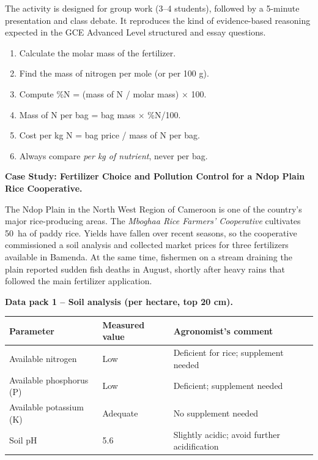 \documentclass[11pt]{article}
\newcommand{\cle}[1]{{\popxbold\color{popdark}#1}}
\newcounter{popsec}
\newcounter{popsub}
\newcommand{\courssub}[1]{%
  \stepcounter{popsub}%
  \par\vspace{9pt}\noindent{\popxbold\fontsize{11.5}{13}\selectfont\color{popink}{\color{poporange}\thepopsec.\thepopsub}\hspace{6pt}#1}\par\nopagebreak\vspace{4pt}
}
\begin{document}
The activity is designed for group work (3--4 students), followed by a 5-minute presentation and class debate. It reproduces the kind of evidence-based reasoning expected in the GCE Advanced Level structured and essay questions.

\begin{methode}
\begin{enumerate}
\item Calculate the molar mass of the fertilizer.
\item Find the mass of nitrogen per mole (or per 100 g).
\item Compute \%N = (mass of N / molar mass) $\times$ 100.
\item Mass of N per bag = bag mass $\times$ \%N/100.
\item Cost per kg N = bag price / mass of N per bag.
\item Always compare \emph{per kg of nutrient}, never per bag.
\end{enumerate}
\end{methode}

\courssub{Situation}

\textbf{Case Study: Fertilizer Choice and Pollution Control for a Ndop Plain Rice Cooperative.}

The Ndop Plain in the North West Region of Cameroon is one of the country's major rice-producing areas. The \emph{Mboghaa Rice Farmers' Cooperative} cultivates \SI{50}{ha} of paddy rice. Yields have fallen over recent seasons, so the cooperative commissioned a soil analysis and collected market prices for three fertilizers available in Bamenda. At the same time, fishermen on a stream draining the plain reported sudden \cle{fish deaths} in August, shortly after heavy rains that followed the main fertilizer application.

\textbf{Data pack 1 -- Soil analysis (per hectare, top 20 cm).}

\begin{center}
\begin{tabularx}{\linewidth}{|l|X|X|}
\hline
\rowcolor{popblueL} \textbf{Parameter} & \textbf{Measured value} & \textbf{Agronomist's comment} \\
\hline
Available nitrogen & Low & Deficient for rice; supplement needed \\
\hline
Available phosphorus (P) & Low & Deficient; supplement needed \\
\hline
Available potassium (K) & Adequate & No supplement needed \\
\hline
Soil pH & 5.6 & Slightly acidic; avoid further acidification \\
\hline
\end{tabularx}
\end{center}
\end{document}
